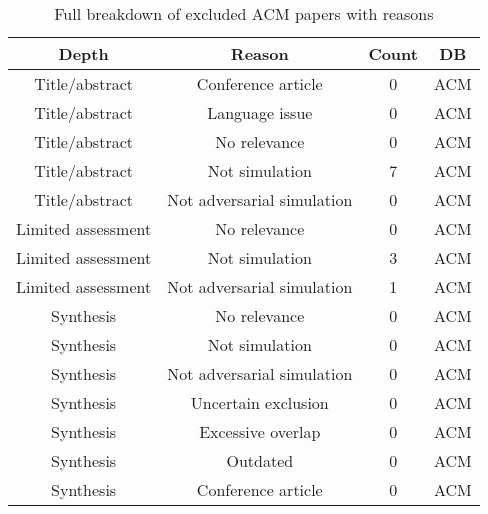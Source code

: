 \documentclass{article}
\begin{document}
\begin{center}
\begin{table}[h!]
\begin{tabular}{ | c | c | c | c |}
\hline
Depth & Reason & Count & DB \\
\hline
Title/abstract & Conference article & 0 & ACM \\
\hline
Title/abstract & Language issue & 0 & ACM \\
\hline
Title/abstract & No relevance & 0 & ACM \\
\hline
Title/abstract & Not simulation & 7 & ACM \\
\hline
Title/abstract & Not adversarial simulation & 0 & ACM \\
\hline
Limited assessment & No relevance & 0 & ACM \\
\hline
Limited assessment & Not simulation & 3 & ACM \\
\hline
Limited assessment & Not adversarial simulation & 1 & ACM \\
\hline
Synthesis & No relevance & 0 & ACM \\
\hline
Synthesis & Not simulation & 0 & ACM \\
\hline
Synthesis & Not adversarial simulation & 0 & ACM \\
\hline
Synthesis & Uncertain exclusion & 0 & ACM \\
\hline
Synthesis & Excessive overlap & 0 & ACM \\
\hline
Synthesis & Outdated & 0 & ACM \\
\hline
Synthesis & Conference article & 0 & ACM \\
\hline
\end{tabular}
\caption{\label{table:RelevanceBreakdownACM} Full breakdown of excluded ACM papers with reasons}
\end{table}
\end{center}
\end{document}
